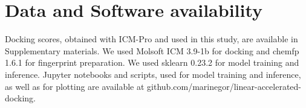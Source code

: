 \section{Data and Software availability}
Docking scores, obtained with ICM-Pro and used in this study, are available in Supplementary materials. We used Molsoft ICM 3.9-1b for docking and chemfp 1.6.1 for fingerprint preparation. We used sklearn 0.23.2 for model training and inference. Jupyter notebooks and scripts, used for model training and inference, as well as for plotting are available at github.com/marinegor/linear-accelerated-docking.



